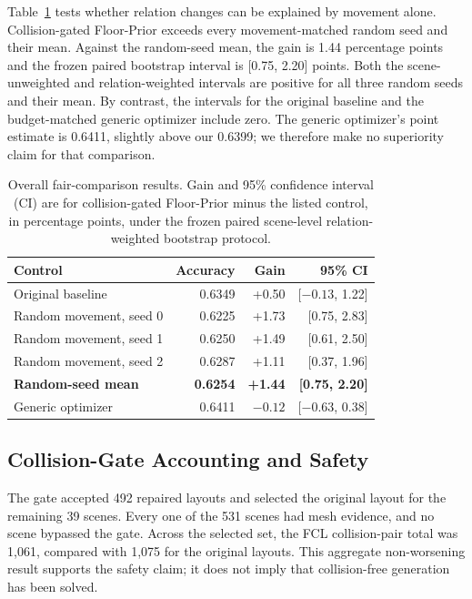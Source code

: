 \documentclass{article}
\newcommand{\fp}{Floor-Prior}
\begin{document}
Table~\ref{tab:controls} tests whether relation changes can be explained by movement alone. Collision-gated \fp{} exceeds every movement-matched random seed and their mean. Against the random-seed mean, the gain is 1.44 percentage points and the frozen paired bootstrap interval is [0.75, 2.20] points. Both the scene-unweighted and relation-weighted intervals are positive for all three random seeds and their mean. By contrast, the intervals for the original baseline and the budget-matched generic optimizer include zero. The generic optimizer's point estimate is 0.6411, slightly above our 0.6399; we therefore make no superiority claim for that comparison.

\begin{table}[t]
\centering
\caption{Overall fair-comparison results. Gain and 95\% confidence interval (CI) are for collision-gated \fp{} minus the listed control, in percentage points, under the frozen paired scene-level relation-weighted bootstrap protocol.}
\label{tab:controls}
\begin{tabular}{lrrr}
\toprule
Control & Accuracy & Gain & 95\% CI \\
\midrule
Original baseline & 0.6349 & +0.50 & [$-0.13$, 1.22] \\
Random movement, seed 0 & 0.6225 & +1.73 & [0.75, 2.83] \\
Random movement, seed 1 & 0.6250 & +1.49 & [0.61, 2.50] \\
Random movement, seed 2 & 0.6287 & +1.11 & [0.37, 1.96] \\
\textbf{Random-seed mean} & \textbf{0.6254} & \textbf{+1.44} & \textbf{[0.75, 2.20]} \\
Generic optimizer & 0.6411 & $-0.12$ & [$-0.63$, 0.38] \\
\bottomrule
\end{tabular}
\end{table}

\subsection{Collision-Gate Accounting and Safety}

The gate accepted 492 repaired layouts and selected the original layout for the remaining 39 scenes. Every one of the 531 scenes had mesh evidence, and no scene bypassed the gate. Across the selected set, the FCL collision-pair total was 1,061, compared with 1,075 for the original layouts. This aggregate non-worsening result supports the safety claim; it does not imply that collision-free generation has been solved.
\end{document}
